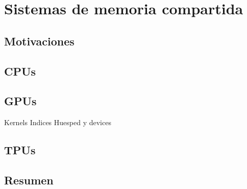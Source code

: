 \chapter{Sistemas de memoria compartida}

\section{Motivaciones}

\section{CPUs}

\section{GPUs}

Kernels
Indices
Huesped y devices

\section{TPUs}

\section{Resumen}
 
